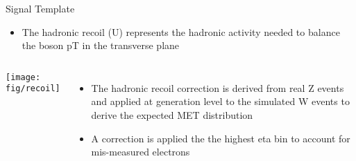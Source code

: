 \documentclass[t, 8pt]{beamer}
\begin{document}
\begin{frame}{Signal Template}
  \begin{itemize}
  \item The hadronic recoil (U) represents the hadronic activity needed to balance the boson pT in the transverse plane
  \end{itemize}

  \begin{columns}[c]
    \texttt{[image: fig/recoil]}
  \begin{itemize}
  \item The hadronic recoil correction is derived from real Z events and applied at generation level to the simulated W events to derive the expected MET distribution
  \item A correction is applied the the highest eta bin to account for mis-measured electrons 
  \end{itemize}
  \end{columns}
\end{frame}
\end{document}
